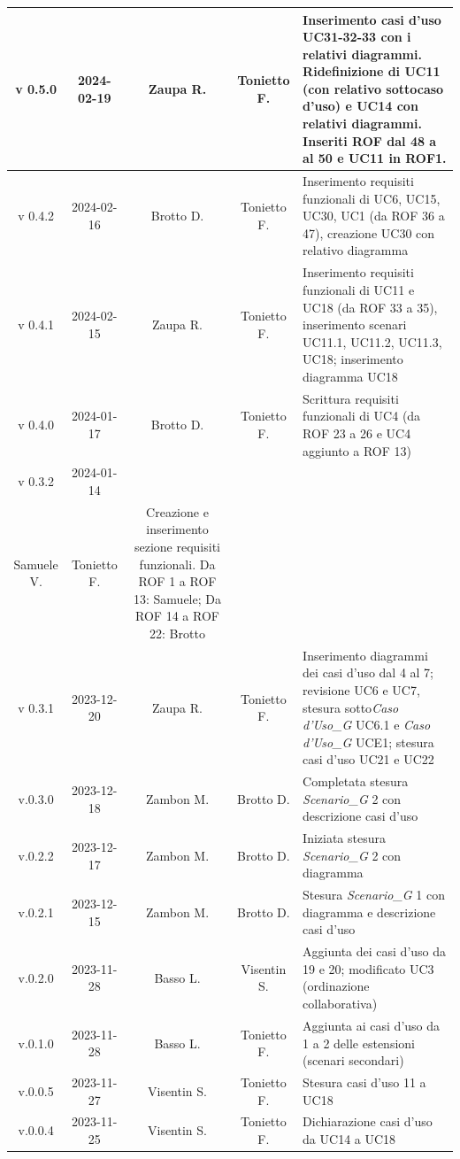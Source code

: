 \documentclass[12pt, oneside]{article}
\begin{document}
\begin{longtable}{|c|c|c|c|p{7cm}|}
\hline
v 0.5.0 & 2024-02-19 & Zaupa R. & Tonietto F. & Inserimento casi d'uso UC31-32-33 con i relativi diagrammi. Ridefinizione di UC11 (con relativo sottocaso d'uso) e UC14 con relativi diagrammi. Inseriti ROF dal 48 a al 50 e UC11 in ROF1. \\
\hline
v 0.4.2 & 2024-02-16 & Brotto D. & Tonietto F. & Inserimento requisiti funzionali di UC6, UC15, UC30, UC1 (da ROF 36 a 47), creazione UC30 con relativo diagramma \\
\hline
v 0.4.1 & 2024-02-15 & Zaupa R. & Tonietto F. & Inserimento requisiti funzionali di UC11 e UC18 (da ROF 33 a 35), inserimento scenari UC11.1, UC11.2, UC11.3, UC18; inserimento diagramma UC18 \\
\hline
v 0.4.0 & 2024-01-17 & Brotto D. & Tonietto F. & Scrittura requisiti funzionali di UC4 (da ROF 23 a 26 e UC4 aggiunto a ROF 13) \\
\hline
v 0.3.2 & 2024-01-14 & 
\begin{tabular}[c]{@{}c@{}}
    Davide B. \\
    Samuele V.
  \end{tabular} 
& Tonietto F. & Creazione e inserimento sezione requisiti funzionali. Da ROF 1 a ROF 13: Samuele; Da ROF 14 a ROF 22: Brotto\\
\hline
v 0.3.1 & 2023-12-20 & Zaupa R. & Tonietto F. & Inserimento diagrammi dei casi d'uso dal 4 al 7; revisione  UC6 e UC7, stesura sotto\textit{Caso d'Uso_G} UC6.1 e \textit{Caso d'Uso_G} UCE1; stesura casi d'uso UC21 e UC22 \\
\hline
v.0.3.0 & 2023-12-18 & Zambon M. & Brotto D. & Completata stesura \textit{Scenario_G} 2 con descrizione casi d'uso \\
\hline
v.0.2.2 & 2023-12-17 & Zambon M. & Brotto D. & Iniziata stesura \textit{Scenario_G} 2 con diagramma \\
\hline
v.0.2.1 & 2023-12-15 & Zambon M. & Brotto D. & Stesura \textit{Scenario_G} 1 con diagramma e descrizione casi d'uso \\
\hline
v.0.2.0 & 2023-11-28 & Basso L. & Visentin S. & Aggiunta dei casi d'uso da 19 e 20; modificato UC3 (ordinazione collaborativa) \\
\hline
v.0.1.0 & 2023-11-28 & Basso L. & Tonietto F. & Aggiunta ai casi d'uso da 1 a 2 delle estensioni (scenari secondari) \\
\hline
v.0.0.5 & 2023-11-27 & Visentin S. & Tonietto F. & Stesura casi d'uso 11 a UC18 \\
\hline
v.0.0.4 & 2023-11-25 & Visentin S. & Tonietto F. & Dichiarazione casi d'uso da UC14 a UC18 \\

\end{longtable}
\end{document}
